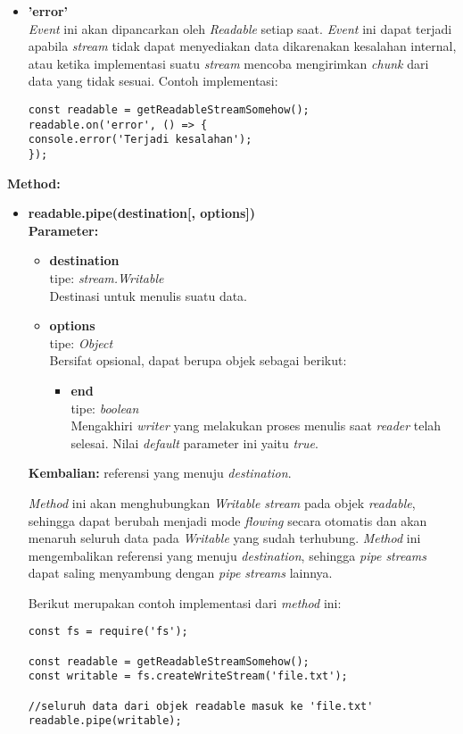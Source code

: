 \begin{enumerate}
\begin{itemize}
\begin{itemize}
			\item \textbf{'error'} \\ \textit{Event} ini akan dipancarkan oleh \textit{Readable} setiap saat. \textit{Event} ini dapat terjadi apabila \textit{stream} tidak dapat menyediakan data dikarenakan kesalahan internal, atau ketika implementasi suatu \textit{stream} mencoba mengirimkan \textit{chunk} dari data yang tidak sesuai. Contoh implementasi:
\begin{lstlisting}
const readable = getReadableStreamSomehow();
readable.on('error', () => {
console.error('Terjadi kesalahan');
});
\end{lstlisting}
			
			
		\end{itemize}
		
		\textbf{Method:}
		\begin{itemize}
			\item \textbf{readable.pipe(destination[, options])} \\ \textbf{Parameter:}
			\begin{itemize}
				\item \textbf{destination} \\tipe: \textit{stream.Writable} \\ Destinasi untuk menulis suatu data.
				\item \textbf{options} \\tipe: \textit{Object} \\ Bersifat opsional, dapat berupa objek sebagai berikut:
				\begin{itemize}
					\item \textbf{end} \\tipe: \textit{boolean} \\ Mengakhiri \textit{writer} yang melakukan proses menulis saat \textit{reader} telah selesai. Nilai \textit{default} parameter ini yaitu \textit{true}.
				\end{itemize}
			\end{itemize}
			\textbf{Kembalian:} referensi yang menuju \textit{destination}.
			
			\textit{Method} ini akan menghubungkan \textit{Writable stream} pada objek \textit{readable}, sehingga dapat berubah menjadi mode \textit{flowing} secara otomatis dan akan menaruh seluruh data pada \textit{Writable} yang sudah terhubung. \textit{Method} ini mengembalikan referensi yang menuju \textit{destination}, sehingga \textit{pipe streams} dapat saling menyambung dengan \textit{pipe streams} lainnya.
			
			Berikut merupakan contoh implementasi dari \textit{method} ini:
\begin{lstlisting}
const fs = require('fs');
			
const readable = getReadableStreamSomehow();
const writable = fs.createWriteStream('file.txt');
			
//seluruh data dari objek readable masuk ke 'file.txt'
readable.pipe(writable); 
\end{lstlisting}
			
		\end{itemize}
	\end{itemize}
\end{enumerate}

